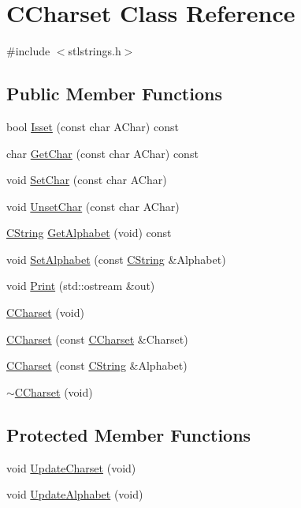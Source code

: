 \hypertarget{classCCharset}{\section{C\-Charset Class Reference}
\label{classCCharset}
}


{\ttfamily \#include $<$stlstrings.\-h$>$}

\subsection*{Public Member Functions}
\begin{DoxyCompactItemize}
\item 
bool \hyperlink{classCCharset_afc2bdd38fc4a5a76f79c384b7e010949}{Isset} (const char A\-Char) const 
\item 
char \hyperlink{classCCharset_a57c884b268bdf924a8eea466d83bb0c3}{Get\-Char} (const char A\-Char) const 
\item 
void \hyperlink{classCCharset_a83fb686e1529fd7756e2518fa3aada35}{Set\-Char} (const char A\-Char)
\item 
void \hyperlink{classCCharset_a3ba43c6f02804f2d8e5e975f884d7f67}{Unset\-Char} (const char A\-Char)
\item 
\hyperlink{classCString}{C\-String} \hyperlink{classCCharset_af103cfcfd67bb0a0c605cae9104324c4}{Get\-Alphabet} (void) const 
\item 
void \hyperlink{classCCharset_a03a13466cc53fee97df68fdffe66e265}{Set\-Alphabet} (const \hyperlink{classCString}{C\-String} \&Alphabet)
\item 
void \hyperlink{classCCharset_a2890d5eda53b22f39b33b5c1eca3b369}{Print} (std\-::ostream \&out)
\item 
\hyperlink{classCCharset_a550b4d6acc0ff40babaa01eb5391954f}{C\-Charset} (void)
\item 
\hyperlink{classCCharset_aee827626805ed9382333323f75062296}{C\-Charset} (const \hyperlink{classCCharset}{C\-Charset} \&Charset)
\item 
\hyperlink{classCCharset_a63eb516c33dc84299d1269ffada3045c}{C\-Charset} (const \hyperlink{classCString}{C\-String} \&Alphabet)
\item 
\hyperlink{classCCharset_a6dd837f6b29926022feab11d04921cd2}{$\sim$\-C\-Charset} (void)
\end{DoxyCompactItemize}
\subsection*{Protected Member Functions}
\begin{DoxyCompactItemize}
\item 
void \hyperlink{classCCharset_ada7eed949293b0202f3cb35aeee6b6f9}{Update\-Charset} (void)
\item 
void \hyperlink{classCCharset_acd9542af26449bec96d5bd7dc36285fe}{Update\-Alphabet} (void)
\end{DoxyCompactItemize}
